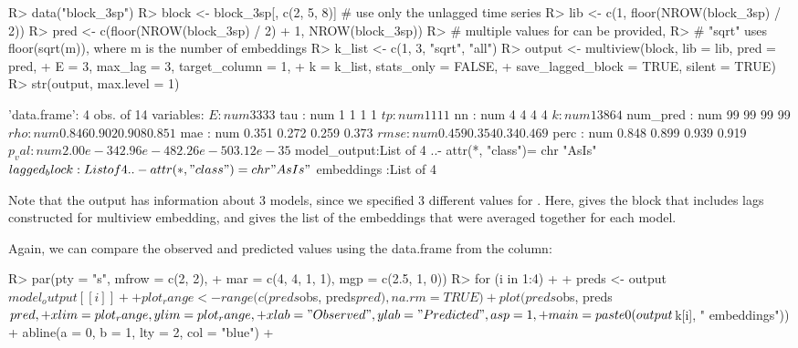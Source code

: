 \documentclass[article]{jss}
\begin{document}
\begin{Schunk}
\begin{Sinput}
R> data("block_3sp")
R> block <- block_3sp[, c(2, 5, 8)] # use only the unlagged time series
R> lib <- c(1, floor(NROW(block_3sp) / 2))
R> pred <- c(floor(NROW(block_3sp) / 2) + 1, NROW(block_3sp))
R> # multiple values for  can be provided, 
R> #   "sqrt" uses floor(sqrt(m)), where m is the number of embeddings
R> k_list <- c(1, 3, "sqrt", "all")
R> output <- multiview(block, lib = lib, pred = pred,
+                      E = 3, max_lag = 3, target_column = 1, 
+                      k = k_list, stats_only = FALSE, 
+                      save_lagged_block = TRUE, silent = TRUE)
R> str(output, max.level = 1)
\end{Sinput}
\begin{Soutput}
'data.frame':	4 obs. of  14 variables:
 $ E           : num  3 3 3 3
 $ tau         : num  1 1 1 1
 $ tp          : num  1 1 1 1
 $ nn          : num  4 4 4 4
 $ k           : num  1 3 8 64
 $ num_pred    : num  99 99 99 99
 $ rho         : num  0.846 0.902 0.908 0.851
 $ mae         : num  0.351 0.272 0.259 0.373
 $ rmse        : num  0.459 0.354 0.34 0.469
 $ perc        : num  0.848 0.899 0.939 0.919
 $ p_val       : num  2.00e-34 2.96e-48 2.26e-50 3.12e-35
 $ model_output:List of 4
  ..- attr(*, "class")= chr "AsIs"
 $ lagged_block:List of 4
  ..- attr(*, "class")= chr "AsIs"
 $ embeddings  :List of 4
\end{Soutput}
\end{Schunk}

Note that the output has information about 3 models, since we specified 3 different values for . Here,  gives the block that includes lags constructed for multiview embedding, and  gives the list of the embeddings that were averaged together for each model.

Again, we can compare the observed and predicted values using the data.frame from the  column:

\begin{Schunk}
\begin{Sinput}
R> par(pty = "s", mfrow = c(2, 2), 
+      mar = c(4, 4, 1, 1), mgp = c(2.5, 1, 0))
R> for (i in 1:4)
+  {
+      preds <- output$model_output[[i]]
+      
+      plot_range <- range(c(preds$obs, preds$pred), na.rm = TRUE)
+      plot(preds$obs, preds$pred, 
+           xlim = plot_range, ylim = plot_range,
+           xlab = "Observed", ylab = "Predicted", asp = 1, 
+           main = paste0(output$k[i], " embeddings"))
+      abline(a = 0, b = 1, lty = 2, col = "blue")
+  }
\end{Sinput}
\end{Schunk}
\end{document}
